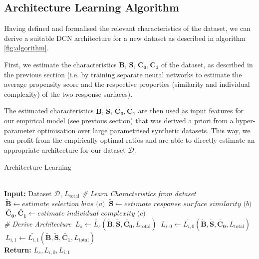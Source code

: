 \subsection{Architecture Learning Algorithm}
Having defined and formalised the relevant characteristics of the dataset, we can derive a suitable DCN architecture for a new dataset as described in algorithm \ref{fig:algorithm}. 

First, we estimate the characteristics $\mathbf{B}$, $\mathbf{S}$, $\mathbf{C_0}, \mathbf{C_1}$ of the dataset, as described in the previous section (i.e. by training separate neural networks to estimate the average propensity score and the respective properties (similarity and individual complexity) of the two response surfaces). 

The estimated characteristics $\tilde{\mathbf{B}}$, $\tilde{\mathbf{S}}$, $\tilde{\mathbf{C_0}}, \tilde{\mathbf{C_1}}$ are then used as input features for our empirical model (see previous section) that was derived a priori from a hyper-parameter optimisation over large parametrised synthetic datasets. This way, we can profit from the empirically optimal ratios and are able to directly estimate an appropriate architecture for our dataset $\mathcal{D}$. 



\begin{algorithm}
	\caption{Architecture Learning}\label{fig:algorithm}
	\begin{algorithmic}[1]
		
		 \\
		\textbf{Input:} Dataset $\mathcal{D}$, $L_{\text{total}}$  
		\State \emph{\# Learn Characteristics from dataset}
		\State $\ \tilde{\mathbf{B}} \gets \textit{estimate selection bias (a)}$
		\State $\ \tilde{\mathbf{S}} \gets \textit{estimate response surface similarity (b)}$
		\State $\ \tilde{\mathbf{C_0}}, \tilde{\mathbf{C_1}} \gets \textit{estimate individual complexity (c)}$\\
		\State \emph{\# Derive Architecture}
		\State $\ {L_s} \gets \tilde{L_s}(\tilde{\mathbf{B}}, \tilde{\mathbf{S}}, \tilde{\mathbf{C_0}}, L_{\text{total}})$
		\State $\ {L_{i,0}}\gets \tilde{L_{i,0}}(\tilde{\mathbf{B}}, \tilde{\mathbf{S}}, \tilde{\mathbf{C_0}}, L_{\text{total}})$
		\State $\ {L_{i,1}}\gets \tilde{L_{i,1}}(\tilde{\mathbf{B}}, \tilde{\mathbf{S}}, \tilde{\mathbf{C_1}}, L_{\text{total}})$ \\
		\textbf{Return:} $L_s, L_{i,0}, L_{i,1}$ 
		
		\EndProcedure
	\end{algorithmic}
\end{algorithm}

	